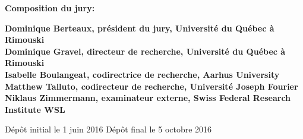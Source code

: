 \thispagestyle{empty}

\null
\vfill
\noindent \textbf{Composition du jury:}\\
\vspace{1cm}

\begin{singlespace}
  \noindent \textbf{Dominique Berteaux, président du jury, Université du Québec à Rimouski}\\

  \noindent \textbf{Dominique Gravel, directeur de recherche, Université du Québec à Rimouski}\\

  \noindent \textbf{Isabelle Boulangeat, codirectrice de recherche, Aarhus University}\\

  \noindent \textbf{Matthew Talluto, codirecteur de recherche, Université Joseph Fourier}\\

  \noindent \textbf{Niklaus Zimmermann, examinateur externe, Swiss Federal Research Institute WSL}\\
\end{singlespace}

\vspace{2cm}
\noindent Dépôt initial le 1 juin 2016
\hspace{3cm}
Dépôt final le 5 octobre 2016


\cleardoublepage
